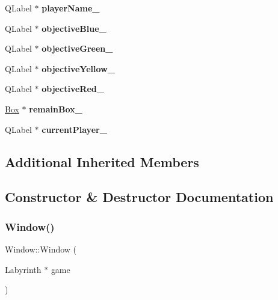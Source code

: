 \begin{DoxyCompactItemize}
Q\+Label $\ast$ {\bfseries player\+Name\+\_\+}
\item 
\mbox{\label{class_window_a27f2dc15c67d87d5cd112a7fb91dd19f}} 
Q\+Label $\ast$ {\bfseries objective\+Blue\+\_\+}
\item 
\mbox{\label{class_window_a225b362a376257c50161cea79b1377d8}} 
Q\+Label $\ast$ {\bfseries objective\+Green\+\_\+}
\item 
\mbox{\label{class_window_a069de7a802d806df01e7c66038531fbb}} 
Q\+Label $\ast$ {\bfseries objective\+Yellow\+\_\+}
\item 
\mbox{\label{class_window_ad1b44cc43f04e39286422fc8c11fa844}} 
Q\+Label $\ast$ {\bfseries objective\+Red\+\_\+}
\item 
\mbox{\label{class_window_a65a8e256e5a31121a5ee673434a44c1f}} 
\mbox{\hyperlink{class_box}{Box}} $\ast$ {\bfseries remain\+Box\+\_\+}
\item 
\mbox{\label{class_window_a07a75399b6de45c21b06a42f1aada603}} 
Q\+Label $\ast$ {\bfseries current\+Player\+\_\+}
\end{DoxyCompactItemize}
\subsection*{Additional Inherited Members}


\subsection{Constructor \& Destructor Documentation}
\mbox{\label{class_window_a2bbdf5c5bf31fa440a4f6a11e6916093}} 
\subsubsection{\texorpdfstring{Window()}{Window()}}
{\footnotesize\ttfamily Window\+::\+Window (\begin{DoxyParamCaption}\item[{Labyrinth $\ast$}]{game }\end{DoxyParamCaption})}



